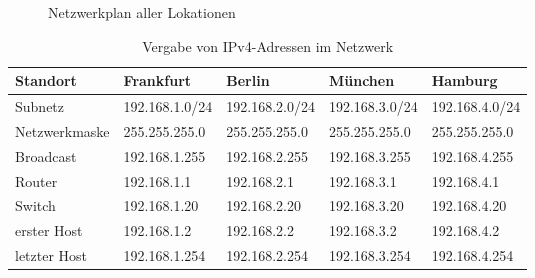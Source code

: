 \documentclass[fontsize=12pt,paper=a4,open=any,parskip=half,
  twoside=false,toc=listof,toc=bibliography,fleqn,leqno,
  captions=nooneline,captions=tableabove,british]{scrbook}
\begin{document}
\begin{figure}[H]
 \centering
 \captionsetup{justification=centering,margin=1cm}
 \caption{Netzwerkplan aller Lokationen}
 \label{netzwerkplan}
\end{figure}

\begin{table}[H]
	\caption{Vergabe von IPv4-Adressen im Netzwerk}
	\label{netzwerkplan-addressen}
	\centering
	\hspace*{-1cm}
	\begin{tabular}{p{3.5cm} p{3cm} p{3cm} p{3cm} p{3cm}}
		\toprule
		 Standort & Frankfurt & Berlin  & München & Hamburg \\
		\midrule 
		Subnetz & 192.168.1.0/24 &  192.168.2.0/24 & 192.168.3.0/24 & 192.168.4.0/24\\
		
		Netzwerkmaske	&255.255.255.0& 255.255.255.0& 255.255.255.0	& 255.255.255.0 \\
		
		Broadcast & 192.168.1.255 &	192.168.2.255 &	192.168.3.255 & 192.168.4.255\\
		
		Router & 192.168.1.1&192.168.2.1& 192.168.3.1 &192.168.4.1\\
		
		Switch & 192.168.1.20& 192.168.2.20&192.168.3.20&	192.168.4.20\\
		
		erster Host& 192.168.1.2& 192.168.2.2& 192.168.3.2&192.168.4.2\\
		
		letzter Host& 192.168.1.254 & 192.168.2.254 & 192.168.3.254 & 192.168.4.254\\
		
	\end{tabular}
	
\end{table}
\end{document}
